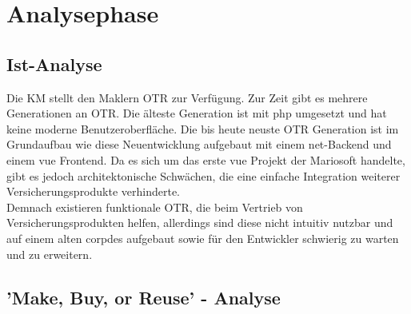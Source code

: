 \section{Analysephase}
\label{analysephase}

\subsection{Ist-Analyse}
\label{ist}
\begin{comment}
evtl alte otrs mit nutzwertanalyse vergleichen?
\end{comment}
Die \ac{KM} stellt den Maklern \ac{OTR} zur Verfügung. Zur Zeit gibt es mehrere Generationen an \ac{OTR}. Die älteste Generation ist mit \gls{php} umgesetzt und hat keine moderne Benutzeroberfläche. Die bis heute neuste \ac{OTR} Generation ist im Grundaufbau wie diese Neuentwicklung aufgebaut mit einem \gls{net}-Backend und einem \gls{vue} Frontend. Da es sich um das erste \gls{vue} Projekt der Mariosoft handelte, gibt es jedoch architektonische Schwächen, die eine einfache Integration weiterer Versicherungsprodukte verhinderte. \\
Demnach existieren funktionale \ac{OTR}, die beim Vertrieb von Versicherungsprodukten helfen, allerdings sind diese nicht intuitiv nutzbar und auf einem alten \gls{corpdes} aufgebaut sowie für den Entwickler schwierig zu warten und zu erweitern.

\subsection{'Make, Buy, or Reuse' - Analyse}
\label{makeOrBuy}


